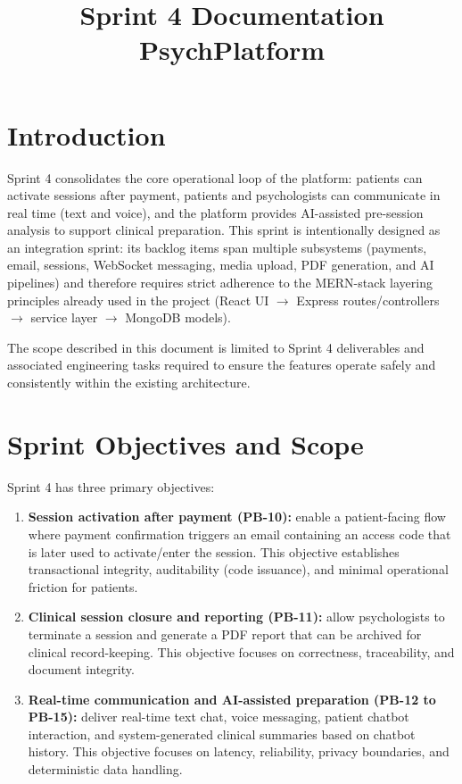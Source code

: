 \documentclass[12pt]{article}
\title{Sprint 4 Documentation\\\large PsychPlatform}
\author{}
\date{}
\begin{document}
\maketitle
\tableofcontents
\newpage

\section{Introduction}
Sprint 4 consolidates the core operational loop of the platform: patients can activate sessions after payment, patients and psychologists can communicate in real time (text and voice), and the platform provides AI-assisted pre-session analysis to support clinical preparation. This sprint is intentionally designed as an integration sprint: its backlog items span multiple subsystems (payments, email, sessions, WebSocket messaging, media upload, PDF generation, and AI pipelines) and therefore requires strict adherence to the MERN-stack layering principles already used in the project (React UI $\rightarrow$ Express routes/controllers $\rightarrow$ service layer $\rightarrow$ MongoDB models).

The scope described in this document is limited to Sprint 4 deliverables and associated engineering tasks required to ensure the features operate safely and consistently within the existing architecture.

\section{Sprint Objectives and Scope}
Sprint 4 has three primary objectives:
\begin{enumerate}[leftmargin=*]
  \item \textbf{Session activation after payment (PB-10):} enable a patient-facing flow where payment confirmation triggers an email containing an access code that is later used to activate/enter the session. This objective establishes transactional integrity, auditability (code issuance), and minimal operational friction for patients.
  \item \textbf{Clinical session closure and reporting (PB-11):} allow psychologists to terminate a session and generate a PDF report that can be archived for clinical record-keeping. This objective focuses on correctness, traceability, and document integrity.
  \item \textbf{Real-time communication and AI-assisted preparation (PB-12 to PB-15):} deliver real-time text chat, voice messaging, patient chatbot interaction, and system-generated clinical summaries based on chatbot history. This objective focuses on latency, reliability, privacy boundaries, and deterministic data handling.
\end{enumerate}
\end{document}
